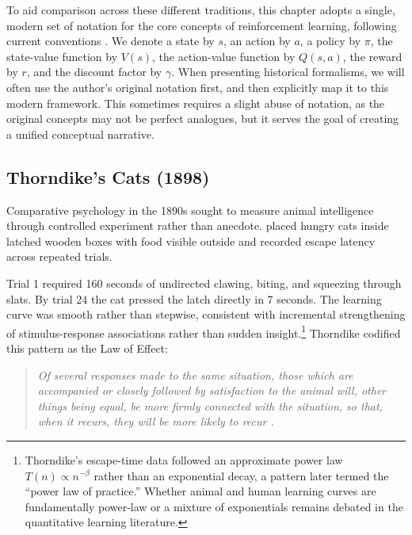 
To aid comparison across these different traditions, this chapter adopts a single, modern set of notation for the core concepts of reinforcement learning, following current conventions \citep{sutton2018}. We denote a state by $s$, an action by $a$, a policy by $\pi$, the state-value function by $V(s)$, the action-value function by $Q(s,a)$, the reward by $r$, and the discount factor by $\gamma$. When presenting historical formalisms, we will often use the author's original notation first, and then explicitly map it to this modern framework. This sometimes requires a slight abuse of notation, as the original concepts may not be perfect analogues, but it serves the goal of creating a unified conceptual narrative.

\subsection{Thorndike's Cats (1898)}

Comparative psychology in the 1890s sought to measure animal intelligence through controlled experiment rather than anecdote. \citet{Thorndike1898} placed hungry cats inside latched wooden boxes with food visible outside and recorded escape latency across repeated trials.

Trial 1 required 160 seconds of undirected clawing, biting, and squeezing through slats. By trial 24 the cat pressed the latch directly in 7 seconds. The learning curve was smooth rather than stepwise, consistent with incremental strengthening of stimulus-response associations rather than sudden insight.\footnote{Thorndike's escape-time data followed an approximate power law $T(n) \propto n^{-\beta}$ rather than an exponential decay, a pattern later termed the ``power law of practice.'' Whether animal and human learning curves are fundamentally power-law or a mixture of exponentials remains debated in the quantitative learning literature.} Thorndike codified this pattern as the Law of Effect:

\begin{quote}\itshape
Of several responses made to the same situation, those which are accompanied or closely followed by satisfaction to the animal will, other things being equal, be more firmly connected with the situation, so that, when it recurs, they will be more likely to recur \citep{Thorndike1898}.
\end{quote}

